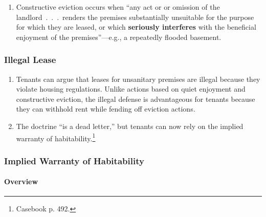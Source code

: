 \begin{enumerate}
    \item Constructive eviction occurs when ``any act or or omission of the 
    landlord~.~.~.~renders the premises substantially unsuitable for the 
    purpose for which they are leased, or which \textbf{seriously interferes} 
    with the beneficial enjoyment of the premises''---e.g., a repeatedly 
    flooded basement.
\end{enumerate}

\subsubsection{Illegal Lease}

\begin{enumerate}
    \item Tenants can argue that leases for unsanitary premises are illegal 
    because they violate housing regulations. Unlike actions based on quiet 
    enjoyment and constructive eviction, the illegal defense is advantageous 
    for tenants because they can withhold rent while fending off eviction 
    actions.
    \item The doctrine ``is a dead letter,'' but tenants can now rely on the 
    implied warranty of habitability.\footnote{Casebook p. 492.}
\end{enumerate}

\subsubsection{Implied Warranty of Habitability} %

\paragraph{Overview}


